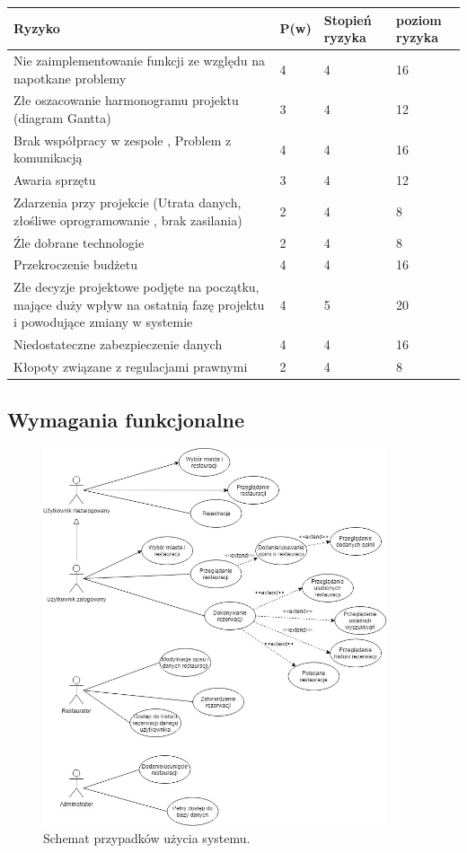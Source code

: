 \documentclass{article}
\begin{document}
\begin{center}
	\begin{tabular}{|p{4cm}|l|l|l|}
		\hline
		Ryzyko & P(w)  & Stopień ryzyka & poziom ryzyka \\ \hline
		Nie zaimplementowanie funkcji ze względu na napotkane problemy & 4 & 4 & 16 \\ \hline
		Złe oszacowanie harmonogramu projektu (diagram Gantta)  & 3 & 4 & 12 \\ \hline
		Brak współpracy w zespole , Problem z komunikacją & 4 & 4 & 16 \\ \hline
		Awaria sprzętu & 3 & 4 & 12 \\ \hline
		Zdarzenia przy projekcie (Utrata danych, złośliwe oprogramowanie , brak zasilania) & 2 & 4 & 8 \\ \hline
		Źle dobrane technologie & 2 & 4 & 8 \\ \hline
		Przekroczenie budżetu & 4 & 4 & 16 \\ \hline
		Złe decyzje projektowe podjęte na początku, mające duży wpływ na ostatnią fazę projektu i powodujące zmiany w systemie & 4 & 5 & 20 \\ \hline
		Niedostateczne zabezpieczenie danych & 4 & 4 & 16 \\ \hline
		Kłopoty związane z regulacjami prawnymi & 2 & 4 & 8 \\ \hline
\end{tabular}
\end{center}


\subsection{Wymagania funkcjonalne}

\begin{figure}
\centering
	\includegraphics[width=0.90\textwidth]{use_case.jpg}
	\caption{Schemat przypadków użycia systemu.}
\end{figure}
\end{document}
